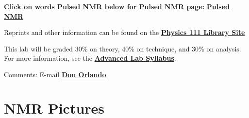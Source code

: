 \documentclass{../lab}
\begin{document}
\textbf{Click on words Pulsed NMR below for Pulsed NMR page:  }\href{http://experimentationlab.berkeley.edu/PulsedNMR}{\textbf{Pulsed NMR}}

Reprints and other information can be found on the \href{http://physics111.lib.berkeley.edu/Physics111/Reprints/NMR/NMR\_index.html}{\textbf{Physics 111 Library Site}}

This lab will be graded 30\% on theory, 40\% on technique, and 30\% on analysis. For more information, see the \href{\AdvancedLabSyllabus}{\textbf{Advanced Lab Syllabus}}.

Comments: E-mail \href{\MailDonOrlando}{\textbf{Don Orlando}}

\section{NMR Pictures}
\end{document}
